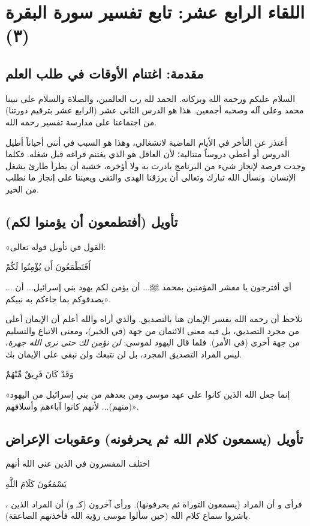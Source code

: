 \chapter{اللقاء الرابع عشر: تابع تفسير سورة البقرة (٣)}

\section{مقدمة: اغتنام الأوقات في طلب العلم}
السلام عليكم ورحمة الله وبركاته. الحمد لله رب العالمين، والصلاة والسلام على نبينا محمد وعلى آله وصحبه أجمعين. هذا هو الدرس الثاني عشر (الرابع عشر بترقيم دورتنا) من اجتماعنا على مدارسة تفسير  رحمه الله.

أعتذر عن التأخر في الأيام الماضية لانشغالي، وهذا هو السبب في أنني أحياناً أطيل الدروس أو أعطي دروساً متتالية؛ لأن العاقل هو الذي يغتنم فراغه قبل شغله. فكلما وجدت فرصة لإنجاز شيء من البرنامج بادرت به ولا أؤخره، خشية أن يطرأ طارئ يشغل الإنسان. ونسأل الله تبارك وتعالى أن يرزقنا الهدى والتقى ويعيننا على إنجاز ما نطلب من الخير.

\separator

\section{تأويل (أفتطمعون أن يؤمنوا لكم)}
 «القول في تأويل قوله تعالى: \begin{ayah}أَفَتَطْمَعُونَ أَن يُؤْمِنُوا لَكُمْ\end{ayah}... أي أفترجون يا معشر المؤمنين بمحمد ﷺ... أن يؤمن لكم يهود بني إسرائيل... أن يصدقوكم بما جاءكم به نبيكم».

\begin{fawaid}
نلاحظ أن  رحمه الله يفسر الإيمان هنا بالتصديق. والذي أراه والله أعلم أن الإيمان أعلى من مجرد التصديق، بل فيه معنى الائتمان من جهة (في الخبر)، ومعنى الاتباع والتسليم من جهة أخرى (في الأمر). فلما قال اليهود لموسى: \textit{لن نؤمن لك حتى نرى الله جهرة}، ليس المراد التصديق المجرد، بل لن نتبعك ولن نبقى على الإيمان بك.
\end{fawaid}

 \begin{ayah}وَقَدْ كَانَ فَرِيقٌ مِّنْهُمْ\end{ayah}  «إنما جعل الله الذين كانوا على عهد موسى ومن بعدهم من بني إسرائيل من اليهود (منهم)... لأنهم كانوا آباءهم وأسلافهم».

\separator

\section{تأويل (يسمعون كلام الله ثم يحرفونه) وعقوبات الإعراض}
اختلف المفسرون في الذين عنى الله أنهم \begin{ayah}يَسْمَعُونَ كَلَامَ اللَّهِ\end{ayah}، فرأى  و أن المراد (يسمعون التوراة ثم يحرفونها). ورأى آخرون (كـ  و) أن المراد الذين باشروا سماع كلام الله (حين سألوا موسى رؤية الله فأخذتهم الصاعقة). 

